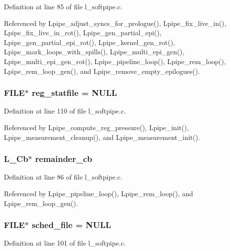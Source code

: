 Definition at line 85 of file l\_\-softpipe.c.

Referenced by Lpipe\_\-adjust\_\-syncs\_\-for\_\-prologue(), Lpipe\_\-fix\_\-live\_\-in(), Lpipe\_\-fix\_\-live\_\-in\_\-rot(), Lpipe\_\-gen\_\-partial\_\-epi(), Lpipe\_\-gen\_\-partial\_\-epi\_\-rot(), Lpipe\_\-kernel\_\-gen\_\-rot(), Lpipe\_\-mark\_\-loops\_\-with\_\-spills(), Lpipe\_\-multi\_\-epi\_\-gen(), Lpipe\_\-multi\_\-epi\_\-gen\_\-rot(), Lpipe\_\-pipeline\_\-loop(), Lpipe\_\-rem\_\-loop(), Lpipe\_\-rem\_\-loop\_\-gen(), and Lpipe\_\-remove\_\-empty\_\-epilogues().
\subsubsection{\setlength{\rightskip}{0pt plus 5cm}FILE$\ast$ \bf{reg\_\-statfile} = NULL}\label{l__softpipe_8c_9f9788ffccb227a45934435833fe651e}




Definition at line 110 of file l\_\-softpipe.c.

Referenced by Lpipe\_\-compute\_\-reg\_\-pressure(), Lpipe\_\-init(), Lpipe\_\-measurement\_\-cleanup(), and Lpipe\_\-measurement\_\-init().
\subsubsection{\setlength{\rightskip}{0pt plus 5cm}L\_\-Cb$\ast$ \bf{remainder\_\-cb}}\label{l__softpipe_8c_785a1b69c62478bf5624354abd3955e1}




Definition at line 86 of file l\_\-softpipe.c.

Referenced by Lpipe\_\-pipeline\_\-loop(), Lpipe\_\-rem\_\-loop(), and Lpipe\_\-rem\_\-loop\_\-gen().
\subsubsection{\setlength{\rightskip}{0pt plus 5cm}FILE$\ast$ \bf{sched\_\-file} = NULL}\label{l__softpipe_8c_dfcefa1a772012ef80d3b8f14f3f150b}




Definition at line 101 of file l\_\-softpipe.c.

